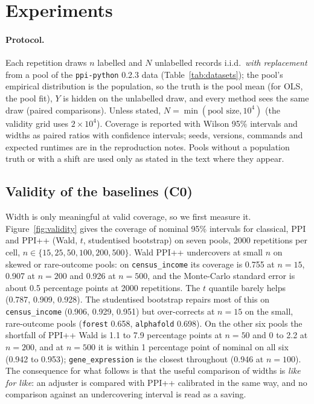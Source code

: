\section{Experiments}
\label{sec:exp}

\paragraph{Protocol.}
Each repetition draws $n$ labelled and $N$ unlabelled records i.i.d.\ \emph{with replacement} from a pool of
the \texttt{ppi-python} 0.2.3 data (Table~\ref{tab:datasets}); the pool's empirical distribution is the population, so the truth is the pool
mean (for OLS, the pool fit), $Y$ is hidden on the unlabelled draw, and every method sees the same draw (paired comparisons).
Unless stated, $N=\min(\text{pool size},10^4)$ (the validity grid uses $2\times10^4$). Coverage is reported with Wilson 95\% intervals and widths as paired
ratios with confidence intervals; seeds, versions, commands and expected runtimes are in the reproduction notes.
Pools without a population truth or with a shift are used only as stated in the text where they appear.

\begin{table}[t]
\caption{Pools used for the mean. Skewness and $\mathrm{corr}(Y,\hat Y)$ are computed on the full pool; $\dim X$ is the number of
features available to the adjusters.}
\label{tab:datasets}
\centering

\end{table}

\subsection{Validity of the baselines (C0)}
\label{sec:validity}
Width is only meaningful at valid coverage, so we first measure it. Figure~\ref{fig:validity} gives the coverage of nominal 95\%
intervals for classical, PPI and PPI++ (Wald, $t$, studentised bootstrap) on seven pools, 2000 repetitions per cell,
$n\in\{15,25,50,100,200,500\}$.
Wald PPI++ undercovers at small $n$ on skewed or rare-outcome pools: on \texttt{census\_income} its coverage is 0.755 at $n=15$,
0.907 at $n=200$ and 0.926 at $n=500$, and the Monte-Carlo standard error is about 0.5 percentage points at 2000 repetitions. The $t$ quantile
barely helps (0.787, 0.909, 0.928). The studentised bootstrap repairs most of this on \texttt{census\_income} (0.906, 0.929, 0.951) but
over-corrects at $n=15$ on the small, rare-outcome pools (\texttt{forest} 0.658, \texttt{alphafold} 0.698). On the other six pools the shortfall of PPI++ Wald is 1.1 to 7.9 percentage points at $n=50$ and 0 to 2.2 at $n=200$, and at $n=500$ it is
within 1 percentage point of nominal on all six (0.942 to 0.953); \texttt{gene\_expression} is the closest throughout (0.946 at $n=100$). The consequence for what follows is that the useful comparison of widths is \emph{like for like}: an adjuster
is compared with PPI++ calibrated in the same way, and no comparison against an undercovering interval is read as a saving.

